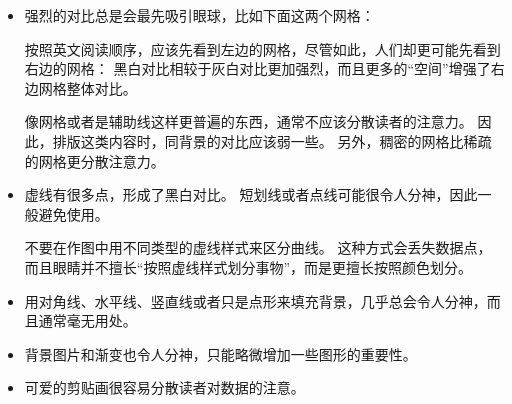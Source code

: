 \begin{itemize}
\item
  强烈的对比总是会最先吸引眼球，比如下面这两个网格：

  \medskip\par

  \medskip
  按照英文阅读顺序，应该先看到左边的网格，尽管如此，人们却更可能先看到右边的网格：
  黑白对比相较于灰白对比更加强烈，而且更多的“空间”增强了右边网格整体对比。

  像网格或者是辅助线这样更普遍的东西，通常不应该分散读者的注意力。
  因此，排版这类内容时，同背景的对比应该弱一些。
  另外，稠密的网格比稀疏的网格更分散注意力。

\item
  虚线有很多点，形成了黑白对比。
  短划线或者点线可能很令人分神，因此一般避免使用。

  不要在作图中用不同类型的虚线样式来区分曲线。
  这种方式会丢失数据点，而且眼睛并不擅长“按照虚线样式划分事物”，而是更擅长按照颜色划分。
\item
  用对角线、水平线、竖直线或者只是点形来填充背景，几乎总会令人分神，而且通常毫无用处。
\item
  背景图片和渐变也令人分神，只能略微增加一些图形的重要性。
\item
  可爱的剪贴画很容易分散读者对数据的注意。
\end{itemize}
